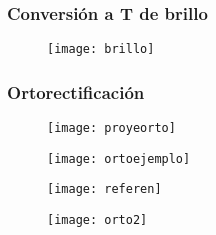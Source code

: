 \documentclass[14pt]{beamer}
\begin{document}
\begin{frame}
\frametitle{Conversión a T de brillo }
  \begin{figure}
    \centering
    \texttt{[image: brillo]}
  \end{figure}
\end{frame}
\begin{frame}
\frametitle{Ortorectificación}
\scriptsize{}
  \begin{figure}
    \centering
    \texttt{[image: proyeorto]}
  \end{figure}
\end{frame}
\begin{frame}
\scriptsize{}
  \begin{figure}
    \centering
    \texttt{[image: ortoejemplo]}
  \end{figure}
\end{frame}
\begin{frame}
\scriptsize{}
  \begin{figure}
    \centering
    \texttt{[image: referen]}
  \end{figure}
\end{frame}
\begin{frame}
  \begin{figure}
    \centering
    \qquad
    \label{fig:1}
  \end{figure}
  \begin{figure}
    \centering
    \qquad
    \label{fig:2}
  \end{figure}
\end{frame}
\begin{frame}
\scriptsize{}
  \begin{figure}
    \centering
    \texttt{[image: orto2]}
  \end{figure}
\end{frame}
\end{document}

